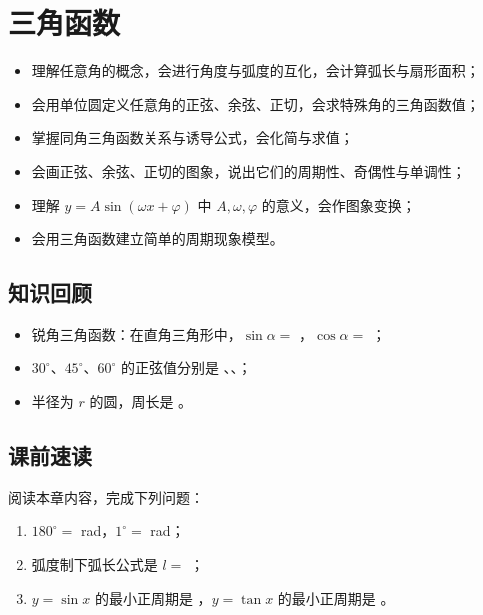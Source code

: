 \section{三角函数}

\begin{learnobjective}
\begin{itemize}
  \item 理解任意角的概念，会进行角度与弧度的互化，会计算弧长与扇形面积；
  \item 会用单位圆定义任意角的正弦、余弦、正切，会求特殊角的三角函数值；
  \item 掌握同角三角函数关系与诱导公式，会化简与求值；
  \item 会画正弦、余弦、正切的图象，说出它们的周期性、奇偶性与单调性；
  \item 理解 $y=A\sin(\omega x+\varphi)$ 中 $A,\omega,\varphi$ 的意义，会作图象变换；
  \item 会用三角函数建立简单的周期现象模型。
\end{itemize}
\end{learnobjective}

\begin{preview}
\subsection*{知识回顾}
\begin{itemize}
  \item 锐角三角函数：在直角三角形中，$\sin\alpha=$ \blank，$\cos\alpha=$ \blank；
  \item $30^\circ$、$45^\circ$、$60^\circ$ 的正弦值分别是 \blank、\blank、\blank；
  \item 半径为 $r$ 的圆，周长是 \blank。
\end{itemize}

\subsection*{课前速读}
阅读本章内容，完成下列问题：
\begin{enumerate}
  \item $180^\circ=$ \blank rad，$1^\circ=$ \blank rad；
  \item 弧度制下弧长公式是 $l=$ \blank；
  \item $y=\sin x$ 的最小正周期是 \blank，$y=\tan x$ 的最小正周期是 \blank。
\end{enumerate}
\end{preview}

